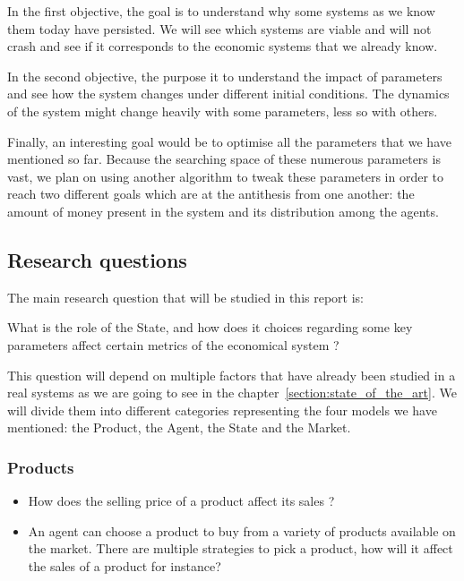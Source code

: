 In the first objective, the goal is to understand why some systems as we know them today have persisted. We will see which systems are viable and will not crash and see if it corresponds to the economic systems that we already know.

In the second objective, the purpose it to understand the impact of parameters and see how the system changes under different initial conditions. The dynamics of the system might change heavily with some parameters, less so with others.

Finally, an interesting goal would be to optimise all the parameters that we have mentioned so far. Because the searching space of these numerous parameters is vast, we plan on using another algorithm to tweak these parameters in order to reach two different goals which are at the antithesis from one another: the amount of money present in the system and its distribution among the agents. 

\subsection{Research questions}

The main research question that will be studied in this report is:

\vspace*{0.5cm}

\begin{center}
    What is the role of the State, and how does it choices regarding some key parameters affect certain metrics of the economical system ?
\end{center}

\vspace*{0.5cm}

This question will depend on multiple factors that have already been studied in a real systems as we are going to see in the  chapter~\ref{section:state_of_the_art}. We will divide them into different categories representing the four models we have mentioned: the Product, the Agent, the State and the Market. 

\subsubsection{Products}

\begin{itemize}
    \item How does the selling price of a product affect its sales ?
    \item An agent can choose a product to buy from a variety of products available on the market. There are multiple strategies to pick a product, how will it affect the sales of a product for instance?
\end{itemize}


